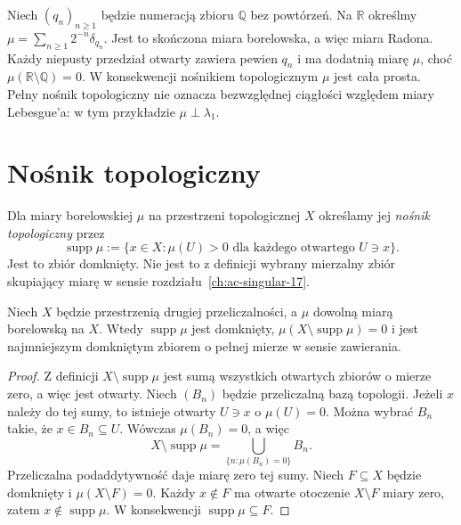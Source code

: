 \begin{przyklad}
Niech $(q_n)_{n\ge1}$ będzie numeracją zbioru
$\mathbb Q$ bez powtórzeń. Na $\mathbb R$ określmy
$\mu=\sum_{n\ge1}2^{-n}\delta_{q_n}$.
Jest to skończona miara borelowska, a więc miara Radona.
Każdy niepusty przedział otwarty zawiera pewien $q_n$
i ma dodatnią miarę $\mu$, choć $\mu(\mathbb R\setminus
\mathbb Q)=0$. W konsekwencji nośnikiem topologicznym
$\mu$ jest cała prosta. Pełny nośnik topologiczny
nie oznacza bezwzględnej ciągłości względem miary Lebesgue'a:
w tym przykładzie $\mu\perp\lambda_1$.
\end{przyklad}

\section{Nośnik topologiczny}
\begin{definicja}
\label{def:support-radon-20}
Dla miary borelowskiej $\mu$ na przestrzeni topologicznej
$X$ określamy jej \emph{nośnik topologiczny} przez
\[
\operatorname{supp}\mu
:=\{x\in X:\mu(U)>0\text{ dla każdego otwartego }
U\ni x\}.
\]
Jest to zbiór domknięty. Nie jest to z definicji
wybrany mierzalny zbiór skupiający miarę w sensie
rozdziału~\ref{ch:ac-singular-17}.
\end{definicja}

\begin{twierdzenie}
\label{thm:support-fullmass-20}
Niech $X$ będzie przestrzenią drugiej przeliczalności,
a $\mu$ dowolną miarą borelowską na $X$. Wtedy
$\operatorname{supp}\mu$ jest domknięty,
$\mu(X\setminus\operatorname{supp}\mu)=0$ i jest
najmniejszym domkniętym zbiorem o pełnej mierze
w sensie zawierania.
\end{twierdzenie}
\begin{proof}
Z definicji
$X\setminus\operatorname{supp}\mu$
jest sumą wszystkich otwartych zbiorów o mierze zero,
a więc jest otwarty. Niech $(B_n)$ będzie przeliczalną
bazą topologii. Jeżeli $x$ należy do tej sumy, to
istnieje otwarty $U\ni x$ o $\mu(U)=0$.
Można wybrać $B_n$ takie, że $x\in B_n\subseteq U$.
Wówczas $\mu(B_n)=0$, a więc
\[
X\setminus\operatorname{supp}\mu
=\bigcup_{\{n:\mu(B_n)=0\}}B_n.
\]
Przeliczalna podaddytywność daje miarę zero tej sumy.
Niech $F\subseteq X$ będzie domknięty i
$\mu(X\setminus F)=0$. Każdy $x\notin F$ ma
otwarte otoczenie $X\setminus F$ miary zero,
zatem $x\notin\operatorname{supp}\mu$.
W konsekwencji $\operatorname{supp}\mu\subseteq F$.
\end{proof}

